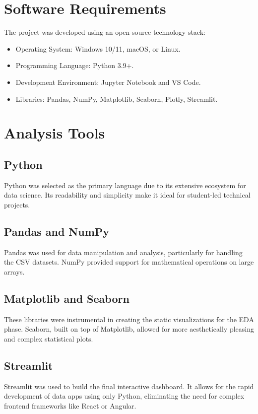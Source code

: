 \documentclass[12pt,a4paper]{report}
\begin{document}
\section{Software Requirements}
The project was developed using an open-source technology stack:
\begin{itemize}
    \item Operating System: Windows 10/11, macOS, or Linux.
    \item Programming Language: Python 3.9+.
    \item Development Environment: Jupyter Notebook and VS Code.
    \item Libraries: Pandas, NumPy, Matplotlib, Seaborn, Plotly, Streamlit.
\end{itemize}

\section{Analysis Tools}
\subsection{Python}
Python was selected as the primary language due to its extensive ecosystem for data science. Its readability and simplicity make it ideal for student-led technical projects.

\subsection{Pandas and NumPy}
Pandas was used for data manipulation and analysis, particularly for handling the CSV datasets. NumPy provided support for mathematical operations on large arrays.

\subsection{Matplotlib and Seaborn}
These libraries were instrumental in creating the static visualizations for the EDA phase. Seaborn, built on top of Matplotlib, allowed for more aesthetically pleasing and complex statistical plots.

\subsection{Streamlit}
Streamlit was used to build the final interactive dashboard. It allows for the rapid development of data apps using only Python, eliminating the need for complex frontend frameworks like React or Angular.
\end{document}
